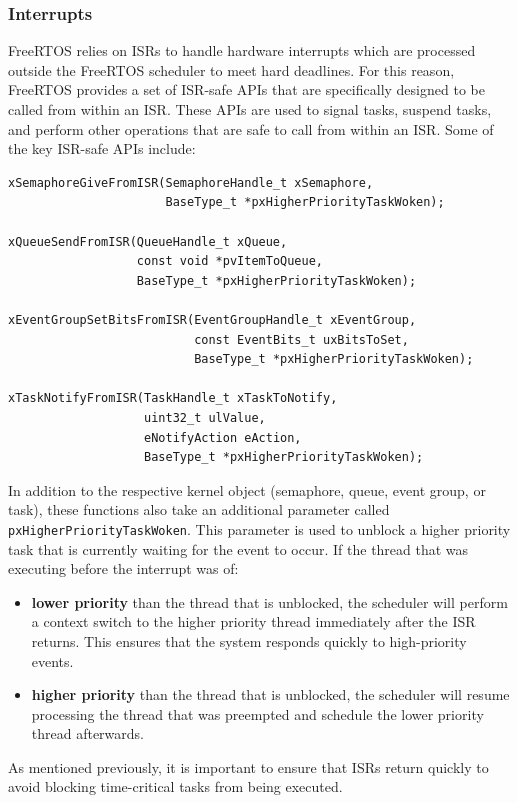 \documentclass{article}
\begin{document}
\subsubsection{Interrupts}
FreeRTOS relies on ISRs to handle hardware interrupts which are
processed outside the FreeRTOS scheduler to meet hard deadlines. For
this reason, FreeRTOS provides a set of ISR-safe APIs that are
specifically designed to be called from within an ISR. These APIs are
used to signal tasks, suspend tasks, and perform other operations that
are safe to call from within an ISR. Some of the key ISR-safe APIs
include:
\begin{verbatim}
xSemaphoreGiveFromISR(SemaphoreHandle_t xSemaphore,
                      BaseType_t *pxHigherPriorityTaskWoken);

xQueueSendFromISR(QueueHandle_t xQueue,
                  const void *pvItemToQueue,
                  BaseType_t *pxHigherPriorityTaskWoken);

xEventGroupSetBitsFromISR(EventGroupHandle_t xEventGroup,
                          const EventBits_t uxBitsToSet,
                          BaseType_t *pxHigherPriorityTaskWoken);

xTaskNotifyFromISR(TaskHandle_t xTaskToNotify,
                   uint32_t ulValue,
                   eNotifyAction eAction,
                   BaseType_t *pxHigherPriorityTaskWoken);
\end{verbatim}
In addition to the respective kernel object (semaphore, queue, event
group, or task), these functions also take an additional parameter
called \texttt{pxHigherPriorityTaskWoken}. This parameter is
used to unblock a higher priority task that is currently waiting for
the event to occur. If the thread that was executing before the
interrupt was of:
\begin{itemize}
    \item \textbf{lower priority} than the thread that is unblocked, the
          scheduler will perform a context switch to the higher priority
          thread immediately after the ISR returns. This ensures that
          the system responds quickly to high-priority events.
    \item \textbf{higher priority} than the thread that is unblocked,
          the scheduler will resume processing the thread that was
          preempted and schedule the lower priority thread afterwards.
\end{itemize}
As mentioned previously, it is important to ensure that ISRs return
quickly to avoid blocking time-critical tasks from being executed.
\end{document}
